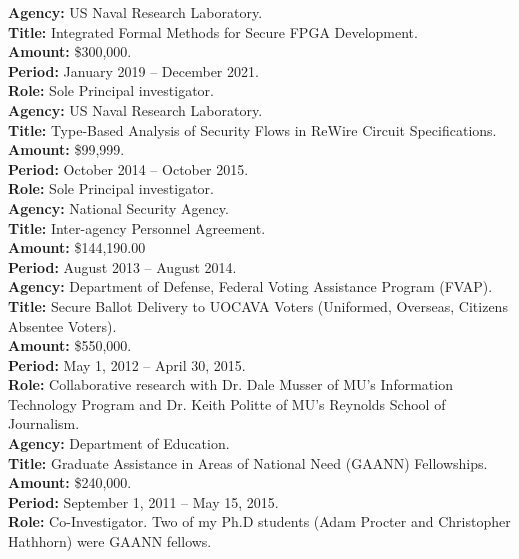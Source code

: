 \documentclass[12pt]{article} %
\begin{document}
{\bf Agency:} US Naval Research Laboratory.
\\
{\bf Title:} Integrated Formal Methods for Secure FPGA Development.
\\
{\bf Amount:} \$300,000.
\\
{\bf Period:}   January 2019  --  December 2021.
\\
{\bf Role:}    Sole  Principal investigator.
\\


{\bf Agency:} US Naval Research Laboratory.
\\
{\bf Title:} Type-Based Analysis of Security Flows in ReWire Circuit Specifications.
\\
{\bf Amount:} \$99,999.
\\
{\bf Period:}   October 2014  --  October 2015.
\\
{\bf Role:}     Sole Principal investigator.
\\

{\bf Agency:} National Security Agency.\\
{\bf Title:} Inter-agency Personnel Agreement.\\
{\bf Amount:} \$144,190.00 \\
{\bf Period:} August 2013 -- August 2014.
\\


{\bf Agency:} Department of Defense, Federal Voting Assistance Program (FVAP).
\\
{\bf Title:} Secure Ballot Delivery to UOCAVA Voters (Uniformed, Overseas, Citizens Absentee Voters). 
\\
{\bf Amount:} \$550,000.
\\
{\bf Period:} May 1, 2012 -- April 30, 2015.
\\
{\bf Role:} Collaborative research with Dr. Dale Musser of MU's Information Technology Program and Dr. Keith Politte of MU's Reynolds School of Journalism. 
\\



{\bf Agency:} Department of Education.
 ~\\
{\bf Title:} Graduate Assistance in Areas of National Need (GAANN) Fellowships.
\\
{\bf Amount:} \$240,000.
\\
{\bf Period:} September 1, 2011 -- May 15, 2015.
\\
{\bf Role:} Co-Investigator. Two of my Ph.D students (Adam Procter and Christopher Hathhorn) were GAANN fellows. 
\\
\end{document}
